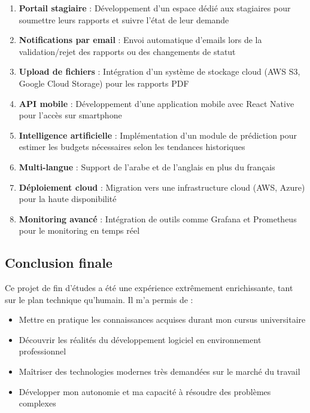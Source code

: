 \documentclass[12pt,a4paper]{report}
\begin{document}
\begin{enumerate}[leftmargin=1cm]
    \item \textbf{Portail stagiaire} : Développement d'un espace dédié aux stagiaires pour soumettre leurs rapports et suivre l'état de leur demande
    
    \item \textbf{Notifications par email} : Envoi automatique d'emails lors de la validation/rejet des rapports ou des changements de statut
    
    \item \textbf{Upload de fichiers} : Intégration d'un système de stockage cloud (AWS S3, Google Cloud Storage) pour les rapports PDF
    
    \item \textbf{API mobile} : Développement d'une application mobile avec React Native pour l'accès sur smartphone
    
    \item \textbf{Intelligence artificielle} : Implémentation d'un module de prédiction pour estimer les budgets nécessaires selon les tendances historiques
    
    \item \textbf{Multi-langue} : Support de l'arabe et de l'anglais en plus du français
    
    \item \textbf{Déploiement cloud} : Migration vers une infrastructure cloud (AWS, Azure) pour la haute disponibilité
    
    \item \textbf{Monitoring avancé} : Intégration de outils comme Grafana et Prometheus pour le monitoring en temps réel
\end{enumerate}

\subsection*{Conclusion finale}

Ce projet de fin d'études a été une expérience extrêmement enrichissante, tant sur le plan technique qu'humain. Il m'a permis de :

\begin{itemize}[leftmargin=1cm]
    \item Mettre en pratique les connaissances acquises durant mon cursus universitaire
    \item Découvrir les réalités du développement logiciel en environnement professionnel
    \item Maîtriser des technologies modernes très demandées sur le marché du travail
    \item Développer mon autonomie et ma capacité à résoudre des problèmes complexes
\end{itemize}
\end{document}
